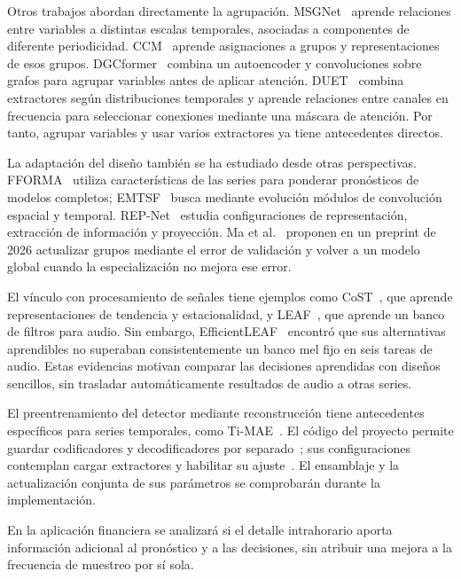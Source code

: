 \documentclass[11pt,letterpaper]{article}
\begin{document}
Otros trabajos abordan directamente la agrupación. MSGNet~\cite{cai2024msgnet} aprende relaciones entre variables a distintas escalas temporales, asociadas a componentes de diferente periodicidad. CCM~\cite{chen2024ccm} aprende asignaciones a grupos y representaciones de esos grupos. DGCformer~\cite{liu2024dgcformer} combina un autoencoder y convoluciones sobre grafos para agrupar variables antes de aplicar atención. DUET~\cite{qiu2025duet} combina extractores según distribuciones temporales y aprende relaciones entre canales en frecuencia para seleccionar conexiones mediante una máscara de atención. Por tanto, agrupar variables y usar varios extractores ya tiene antecedentes directos.

La adaptación del diseño también se ha estudiado desde otras perspectivas. FFORMA~\cite{montero2020fforma} utiliza características de las series para ponderar pronósticos de modelos completos; EMTSF~\cite{liang2024emtsf} busca mediante evolución módulos de convolución espacial y temporal. REP-Net~\cite{leppich2025repnet} estudia configuraciones de representación, extracción de información y proyección. Ma et al.~\cite{ma2026heterogeneity} proponen en un preprint de 2026 actualizar grupos mediante el error de validación y volver a un modelo global cuando la especialización no mejora ese error.

El vínculo con procesamiento de señales tiene ejemplos como CoST~\cite{woo2022cost}, que aprende representaciones de tendencia y estacionalidad, y LEAF~\cite{zeghidour2021leaf}, que aprende un banco de filtros para audio. Sin embargo, EfficientLEAF~\cite{schlueter2022efficientleaf} encontró que sus alternativas aprendibles no superaban consistentemente un banco mel fijo en seis tareas de audio. Estas evidencias motivan comparar las decisiones aprendidas con diseños sencillos, sin trasladar automáticamente resultados de audio a otras series.

El preentrenamiento del detector mediante reconstrucción tiene antecedentes específicos para series temporales, como Ti-MAE~\cite{li2023timae}. El código del proyecto permite guardar codificadores y decodificadores por separado~\cite{featureextractor2026manager}; sus configuraciones contemplan cargar extractores y habilitar su ajuste~\cite{predictor2026trainfe}. El ensamblaje y la actualización conjunta de sus parámetros se comprobarán durante la implementación.

En la aplicación financiera se analizará si el detalle intrahorario aporta información adicional al pronóstico y a las decisiones, sin atribuir una mejora a la frecuencia de muestreo por sí sola. 
\end{document}
